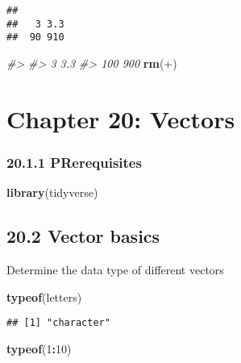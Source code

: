 \documentclass[
]{article}
\newenvironment{Shaded}{\begin{snugshade}}{\end{snugshade}}
\newcommand{\AttributeTok}[1]{\textcolor[rgb]{0.13,0.29,0.53}{#1}}
\newcommand{\CommentTok}[1]{\textcolor[rgb]{0.56,0.35,0.01}{\textit{#1}}}
\newcommand{\DecValTok}[1]{\textcolor[rgb]{0.00,0.00,0.81}{#1}}
\newcommand{\FunctionTok}[1]{\textcolor[rgb]{0.13,0.29,0.53}{\textbf{#1}}}
\newcommand{\NormalTok}[1]{#1}
\newcommand{\SpecialCharTok}[1]{\textcolor[rgb]{0.81,0.36,0.00}{\textbf{#1}}}
\newcommand{\StringTok}[1]{\textcolor[rgb]{0.31,0.60,0.02}{#1}}
\begin{document}
\begin{verbatim}
## 
##   3 3.3 
##  90 910
\end{verbatim}

\begin{Shaded}
\begin{Highlighting}[]
\CommentTok{\#\textgreater{} }
\CommentTok{\#\textgreater{}   3 3.3 }
\CommentTok{\#\textgreater{} 100 900}
\FunctionTok{rm}\NormalTok{(}\StringTok{\textasciigrave{}}\AttributeTok{+}\StringTok{\textasciigrave{}}\NormalTok{)}
\end{Highlighting}
\end{Shaded}

\hypertarget{chapter-20-vectors}{%
\section{Chapter 20: Vectors}\label{chapter-20-vectors}}

\hypertarget{prerequisites}{%
\subsubsection{20.1.1 PRerequisites}\label{prerequisites}}

\begin{Shaded}
\begin{Highlighting}[]
\FunctionTok{library}\NormalTok{(tidyverse)}
\end{Highlighting}
\end{Shaded}

\hypertarget{vector-basics}{%
\subsection{20.2 Vector basics}\label{vector-basics}}

Determine the data type of different vectors

\begin{Shaded}
\begin{Highlighting}[]
\FunctionTok{typeof}\NormalTok{(letters)}
\end{Highlighting}
\end{Shaded}

\begin{verbatim}
## [1] "character"
\end{verbatim}

\begin{Shaded}
\begin{Highlighting}[]
\FunctionTok{typeof}\NormalTok{(}\DecValTok{1}\SpecialCharTok{:}\DecValTok{10}\NormalTok{)}
\end{Highlighting}
\end{Shaded}
\end{document}
